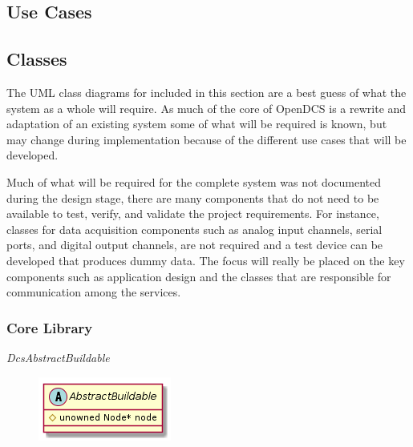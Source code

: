   \subsection{Use Cases}\label{sec:dsg-use}


  \subsection{Classes}\label{sec:dsg-classes}

    The UML class diagrams for included in this section are a best guess of
    what the system as a whole will require. As much of the core of OpenDCS
    is a rewrite and adaptation of an existing system some of what will be
    required is known, but may change during implementation because of the
    different use cases that will be developed.

    Much of what will be required for the complete system was not documented
    during the design stage, there are many components that do not need to be
    available to test, verify, and validate the project requirements. For
    instance, classes for data acquisition components such as analog input
    channels, serial ports, and digital output channels, are not required and
    a test device can be developed that produces dummy data. The focus will
    really be placed on the key components such as application design and the
    classes that are responsible for communication among the services.


    \subsubsection{Core Library}\label{sec:dsg-classes-core}

      \emph{DcsAbstractBuildable}

        \begin{figure}[H]
          \includegraphics{figures/design/class/core/abstract-buildable}
        \end{figure}

